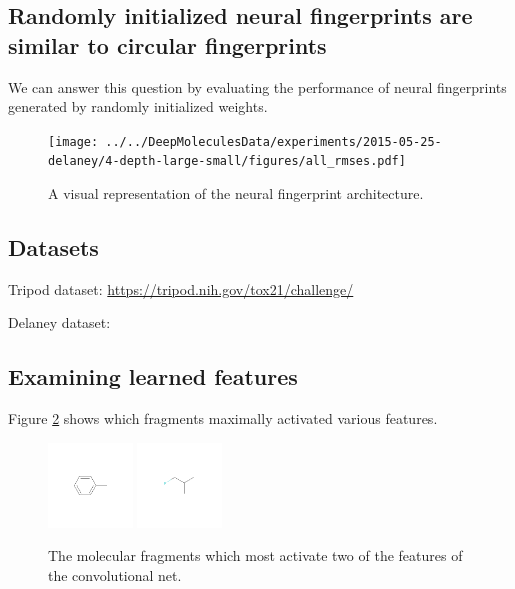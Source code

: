 \documentclass{article}
\begin{document}
\subsection{Randomly initialized neural fingerprints are similar to circular fingerprints}
\label{sec:random is equivalent}

We can answer this question by evaluating the performance of neural fingerprints generated by randomly initialized weights.

\begin{figure}[h]
\centerline{\texttt{[image: ../../DeepMoleculesData/experiments/2015-05-25-delaney/4-depth-large-small/figures/all\_rmses.pdf]}}
\caption{A visual representation of the neural fingerprint architecture.}
\label{fig:architecture sketch}
\end{figure}

\subsection{Datasets}

Tripod dataset: \url{https://tripod.nih.gov/tox21/challenge/}
\cite{unterthiner2015toxicity}

Delaney dataset:
\cite{delaney_data_2004}


\subsection{Examining learned features}

Figure \ref{fig:learned features} shows which fragments maximally activated various features.

\begin{figure}[h]
\includegraphics[width=0.2\textwidth]{figures/convnet-features/hidden-unit-0}
\includegraphics[width=0.2\textwidth]{figures/convnet-features/hidden-unit-1}
\caption{The molecular fragments which most activate two of the features of the convolutional net.}
\label{fig:learned features}
\end{figure}
\end{document}
